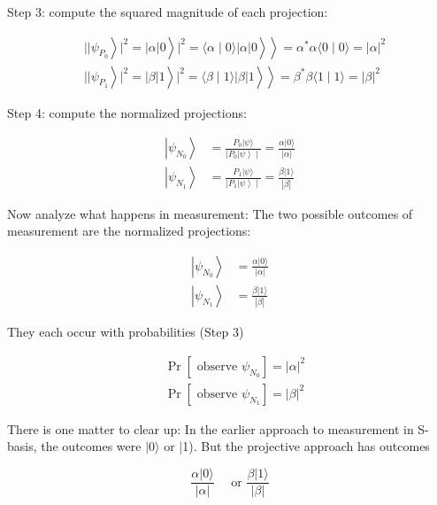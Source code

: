 \documentclass[main.tex]{subfiles}
\begin{document}
    Step 3: compute the squared magnitude of each projection:
    
    $$
    \begin{aligned}
    &\left.\left.\left.\left.|| \psi_{P_{0}}\right\rangle\left.\right|^{2}=|\alpha| 0\right\rangle\left.\right|^{2}=\langle\alpha \mid 0\rangle|\alpha| 0\right\rangle\right\rangle=\alpha^{*} \alpha\langle 0 \mid 0\rangle=|\alpha|^{2} \\
    &\left.\left.\left.\left.|| \psi_{P_{1}}\right\rangle\left.\right|^{2}=|\beta| 1\right\rangle\left.\right|^{2}=\langle\beta \mid 1\rangle|\beta| 1\right\rangle\right\rangle=\beta^{*} \beta\langle 1 \mid 1\rangle=|\beta|^{2}
    \end{aligned}
    $$
    
    Step 4: compute the normalized projections:
    
    $$
    \begin{aligned}
    \left|\psi_{N_{0}}\right\rangle &=\frac{P_{0}|\psi\rangle}{\left.\left|P_{0}\right| \psi\right\rangle \mid}=\frac{\alpha|0\rangle}{|\alpha|} \\
    \left|\psi_{N_{1}}\right\rangle &=\frac{P_{1}|\psi\rangle}{\left.\left|P_{1}\right| \psi\right\rangle \mid}=\frac{\beta|1\rangle}{|\beta|}
    \end{aligned}
    $$
    
    Now analyze what happens in measurement: The two possible outcomes of measurement are the normalized projections:
    
    $$
    \begin{aligned}
    \left|\psi_{N_{0}}\right\rangle &=\frac{\alpha|0\rangle}{|\alpha|} \\
    \left|\psi_{N_{1}}\right\rangle &=\frac{\beta|1\rangle}{|\beta|}
    \end{aligned}
    $$
    
    They each occur with probabilities (Step 3)
    
    $$
    \begin{aligned}
    &\operatorname{Pr}\left[\text { observe } \psi_{N_{0}}\right]=|\alpha|^{2} \\
    &\operatorname{Pr}\left[\text { observe } \psi_{N_{1}}\right]=|\beta|^{2}
    \end{aligned}
    $$
    
    There is one matter to clear up: In the earlier approach to measurement in S-basis, the outcomes were $|0\rangle$ or |1). But the projective approach has outcomes
    
    $$
    \frac{\alpha|0\rangle}{|\alpha|} \quad \text { or } \frac{\beta|1\rangle}{|\beta|}
    $$
    
\end{document}
